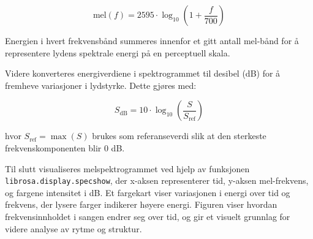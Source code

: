 \begin{equation*}
    \text{mel}(f) = 2595 \cdot \log_{10}\left(1 + \frac{f}{700}\right)
\end{equation*}

Energien i hvert frekvensbånd summeres innenfor et gitt antall mel-bånd for å representere 
lydens spektrale energi på en perceptuell skala.

Videre konverteres energiverdiene i spektrogrammet til desibel (dB) for å fremheve variasjoner 
i lydstyrke. Dette gjøres med:

\begin{equation*}
    S_{\text{dB}} = 10 \cdot \log_{10}\left(\frac{S}{S_{\text{ref}}}\right)
\end{equation*}

hvor \( S_{\text{ref}} = \max(S) \) brukes som referanseverdi slik at den sterkeste 
frekvenskomponenten blir 0 dB.

Til slutt visualiseres melspektrogrammet ved hjelp av funksjonen \texttt{librosa.display.specshow}, 
der x-aksen representerer tid, y-aksen mel-frekvens, og fargene intensitet i dB. Et fargekart viser variasjonen i energi over tid og frekvens, der lysere farger indikerer høyere energi. Figuren viser hvordan frekvensinnholdet i sangen endrer seg over tid, og gir et visuelt grunnlag for videre analyse av rytme og struktur.




